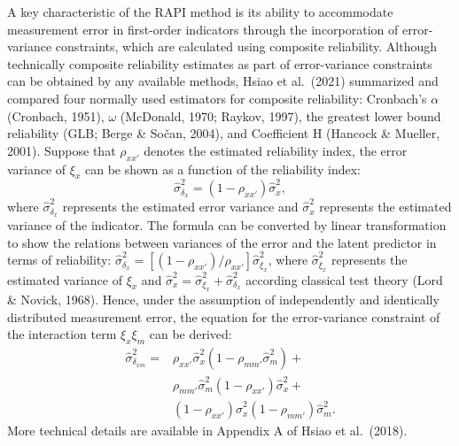 \documentclass[
  man]{apa6}
\begin{document}
A key characteristic of the RAPI method is its ability to accommodate measurement error in first-order indicators through the incorporation of error-variance constraints, which are calculated using composite reliability. Although technically composite reliability estimates as part of error-variance constraints can be obtained by any available methods, Hsiao et al.~(2021) summarized and compared four normally used estimators for composite reliability: Cronbach's \(\alpha\) (Cronbach, 1951), \(\omega\) (McDonald, 1970; Raykov, 1997), the greatest lower bound reliability (GLB; Berge \& Sočan, 2004), and Coefficient H (Hancock \& Mueller, 2001). Suppose that \(\rho_{xx'}\) denotes the estimated reliability index, the error variance of \(\xi_{x}\) can be shown as a function of the reliability index:
\begin{equation}
\hat{\sigma}^2_{\delta_{x}} = (1 - \rho_{xx'})\hat{\sigma}^2_{{x}},
\end{equation}
where \(\hat{\sigma}^2_{\delta_{x}}\) represents the estimated error variance and \(\hat{\sigma}^2_{{x}}\) represents the estimated variance of the indicator. The formula can be converted by linear transformation to show the relations between variances of the error and the latent predictor in terms of reliability: \(\hat{\sigma}_{\delta_{x}}^2 = [(1 - \rho_{xx'})/{\rho_{xx'}}]\hat{\sigma}^2_{\xi_{x}}\), where \(\hat{\sigma}^2_{\xi_{x}}\) represents the estimated variance of \(\xi_{x}\) and \(\hat{\sigma}^2_{{x}} = {\hat{\sigma}^2_{\xi_{x}} + \hat{\sigma}^2_{\delta_{x}}}\) according classical test theory (Lord \& Novick, 1968). Hence, under the assumption of independently and identically distributed measurement error, the equation for the error-variance constraint of the interaction term \(\xi_{x}\xi_{m}\) can be derived:
\begin{equation}
\begin{aligned}
\hat{\sigma}^2_{\delta_{xm}} = & \rho_{xx'}\hat{\sigma}^2_{{x}}(1 - \rho_{mm'}\hat{\sigma}^2_{{m}}) + \\&
                        \rho_{mm'}\hat{\sigma}^2_{{m}}(1-\rho_{xx'})\hat{\sigma}^2_{{x}} + \\&
                        (1 - \rho_{xx'})\hat{\sigma}^2_{{x}}(1 - \rho_{mm'})\hat{\sigma}^2_{{m}}. 
\end{aligned}
\end{equation}
More technical details are available in Appendix A of Hsiao et al.~(2018).
\end{document}
